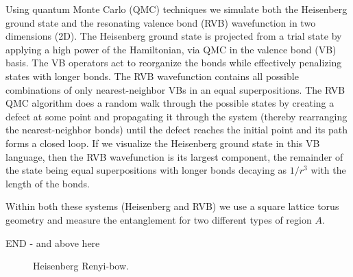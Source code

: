 \documentclass[prl,aps,twocolumn,floatfix,amsmath,amssymb,superscriptaddress,tightenlines]{revtex4}
\begin{document}
Using quantum Monte Carlo (QMC) techniques we simulate both the Heisenberg ground state and the resonating valence bond (RVB) wavefunction in two dimensions (2D). 
The Heisenberg ground state is projected from a trial state by applying a high power of the Hamiltonian, via QMC in the valence bond (VB) basis.\cite{Sandvik_VBQMC}
The VB operators act to reorganize the bonds while effectively penalizing states with longer bonds.
The RVB wavefunction contains all possible combinations of only nearest-neighbor VBs in an equal superpositions.
The RVB QMC algorithm does a random walk through the possible states by creating a defect at some point and propagating it through the system (thereby rearranging the nearest-neighbor bonds) until the defect reaches the initial point and its path forms a closed loop.
If we visualize the Heisenberg ground state in this VB language, then the RVB wavefunction is its largest component, the remainder of the state being equal superpositions with longer bonds decaying as $1/r^3$ \cite{Sandvik_VB_decay} with the length of the bonds.

Within both these systems (Heisenberg and RVB) we use a square lattice torus geometry and measure the entanglement for two different types of region $A$.

{\color{red} END - and above here}

 \begin{figure}[h]
   \begin{center}
   \end{center}
   \caption{Heisenberg Renyi-bow. }
   \label{fig:1}
 \end{figure}
\end{document}
